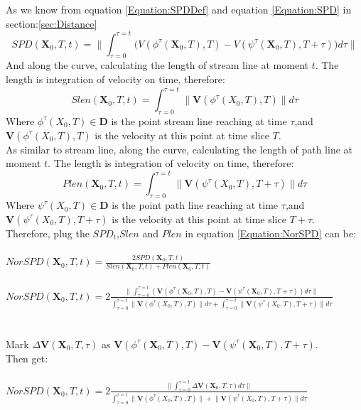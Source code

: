 \documentclass[
     11pt,         %
     a4paper,      %
     oneside,
     ]{article}
\newcommand{\vect}[1]{\boldsymbol{#1}}
\begin{document}
	As we know from equation \ref{Equation:SPDDef} and equation \ref{Equation:SPD} in section:\ref{sec:Distance}
	 	$$SPD(\vect{X}_{0},T,t)=\biggr\lVert\int_{\tau=0}^{\tau=t}\biggr( V(\phi^{\tau}(\vect{X}_{0},T),T)-V(\psi^{\tau}(\vect{X}_{0},T),T+\tau)\biggr) d\tau\biggr\rVert$$
	 And along the curve, calculating the length of stream line at moment $t$. The length is integration of velocity on time, therefore:
	 $$Slen(\vect{X}_{0},T,t)=\int_{\tau=0}^{\tau=t}\biggr\lVert\vect{V}(\phi^{\tau}(X_{0},T),T)\biggr\rVert d\tau$$
	 Where $\phi^{\tau}(X_{0},T)\in \vect{D}$ is the point stream line reaching at time $\tau$,and $\vect{V}(\phi^{\tau}(X_{0},T),T)$ is the velocity at this point at time slice $T$.\\
	 As similar to stream line, along the curve, calculating the length of path line at moment $t$. The length is integration of velocity on time, therefore:
	 $$Plen(\vect{X}_{0},T,t)=\int_{\tau=0}^{\tau=t}\biggr\lVert\vect{V}(\psi^{\tau}(X_{0},T),T+\tau)\biggr\rVert d\tau$$
	 Where $\psi^{\tau}(X_{0},T)\in \vect{D}$ is the point path line reaching at time $\tau$,and $\vect{V}(\psi^{\tau}(X_{0},T),T+\tau)$ is the velocity at this point at time slice $T+\tau$.\\
	 Therefore, plug the $SPD_{t}$,$Slen$ and $Plen$ in equation \ref{Equation:NorSPD} can be:\\
	 \\
	 $NorSPD(\vect{X}_{0},T,t)=\frac{2SPD(\vect{X}_{0},T,t)}{Slen(\vect{X}_{0},T,t)+Plen(\vect{X}_{0},T,t)}$\\
	 \\
	 $NorSPD(\vect{X}_{0},T,t)=2\frac{\lVert\int_{\tau=0}^{\tau=t}( \vect{V}(\phi^{\tau}(\vect{X}_{0},T),T)-\vect{V}(\psi^{\tau}(\vect{X}_{0},T),T+\tau)) d\tau\rVert}{\int_{\tau=0}^{\tau=t}\lVert\vect{V}(\phi^{\tau}(X_{0},T),T)\rVert d\tau+\int_{\tau=0}^{\tau=t}\lVert\vect{V}(\psi^{\tau}(X_{0},T),T+\tau)\rVert d\tau}$\\
	 \\
	 \\
	 Mark $\Delta\vect{V}(\vect{X}_{0},T,\tau)$ as $\vect{V}(\phi^{\tau}(\vect{X}_{0},T),T)-\vect{V}(\psi^{\tau}(\vect{X}_{0},T),T+\tau)$.\\
	 Then get:\\
	 \\
	 $NorSPD(\vect{X}_{0},T,t)=2\frac{\lVert\int_{\tau=0}^{\tau=t}\Delta\vect{V}(\vect{X}_{0},T,\tau)d\tau\rVert}{\int_{\tau=0}^{\tau=t}\lVert\vect{V}(\phi^{\tau}(X_{0},T),T)\rVert+\lVert\vect{V}(\psi^{\tau}(X_{0},T),T+\tau)\rVert d\tau}$\\
\end{document}
